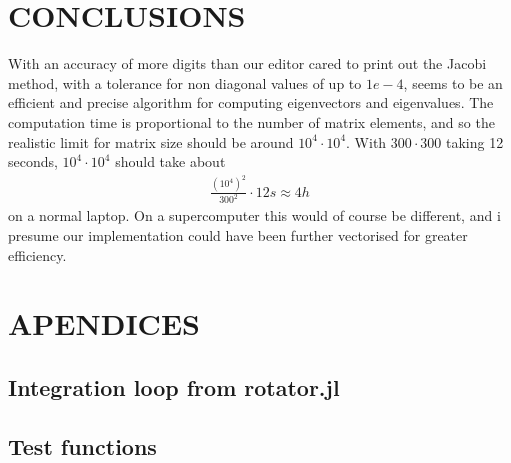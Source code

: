 \documentclass[a4paper]{article}
\begin{document}
\section{CONCLUSIONS}
With an accuracy of more digits than our editor cared to print out the Jacobi method, with a tolerance for non diagonal values of up to $1e-4$, seems to be an efficient and precise algorithm for computing eigenvectors and eigenvalues. The computation time is proportional to the number of matrix elements, and so the realistic limit for matrix size should be around $10^4 \cdot 10^4$. With $300 \cdot 300$ taking 12 seconds, $10^4 \cdot 10^4$ should take about
\begin{align}
\frac{(10^4)^2}{300^2}\cdot 12s\approx 4h
\end{align}
on a normal laptop. On a supercomputer this would of course be different, and i presume our implementation could have been further vectorised for greater efficiency.


\section{APENDICES}
\subsection{Integration loop from rotator.jl}\label{rotator.jl}


\subsection{Test functions}\label{opp_c.jl}

\end{document}
